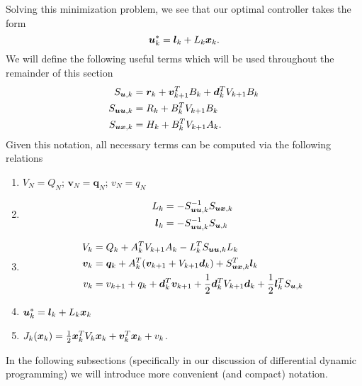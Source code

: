 Solving this minimization problem, we see that our optimal controller takes the form
\begin{equation}
    \bm{u}^*_{k} =\bm{l}_k +  L_{k} \bm{x}_{k}.
\end{equation}
We will define the following useful terms which will be used throughout the remainder of this section
\begin{align}
\label{eq:Qk_lqr}
    S_{\bm{u},k} &= \bm{r}_k +  \bm{v}^T_{k+1} B_k + \bm{d}^T_k V_{k+1} B_k \\
    S_{\bm{u} \bm{u},k} &= R_k + B_k^T V_{k+1} B_k\\
    S_{\bm{u} \bm{x},k} &= H_k + B_k^T V_{k+1} A_k.
\end{align}
Given this notation, all necessary terms can be computed via the following relations
\begin{enumerate}
    \item $V_N = Q_N$; $\bm{v}_N = \bm{q}_N$; $v_N = q_N$
    \item \begin{align} L_k &= - S_{\bm{u} \bm{u},k}^{-1} S_{\bm{u} \bm{x},k}\\
    \bm{l}_k &= - S_{\bm{u} \bm{u},k}^{-1} S_{\bm{u},k}
    \end{align}
    \item 
    \begin{align}
        V_k &= Q_{k}  + A_k^T V_{k+1} A_k - L_k^T S_{\bm{u} \bm{u},k} L_k\\
        \bm{v}_k &= \bm{q}_k + A_k^T (\bm{v}_{k+1} + V_{k+1} \bm{d}_k) + S^T_{\bm{u} \bm{x},k} \bm{l}_k \\
        v_k &= v_{k+1} + q_k + \bm{d}_k^T \bm{v}_{k+1} + \frac{1}{2} \bm{d}_k^T V_{k+1} \bm{d}_k + \frac{1}{2} \bm{l}_k^T S_{\bm{u},k}
    \end{align}
    \item $\bm{u}^*_{k} =\bm{l}_k +  L_{k} \bm{x}_{k}$
    \item $J_k(\bm{x}_k) = \frac{1}{2}\bm{x}_k^T V_k \bm{x}_k + \bm{v}_k^T \bm{x}_k + v_k$.
\end{enumerate}
In the following subsections (specifically in our discussion of differential dynamic programming) we will introduce more convenient (and compact) notation. 

